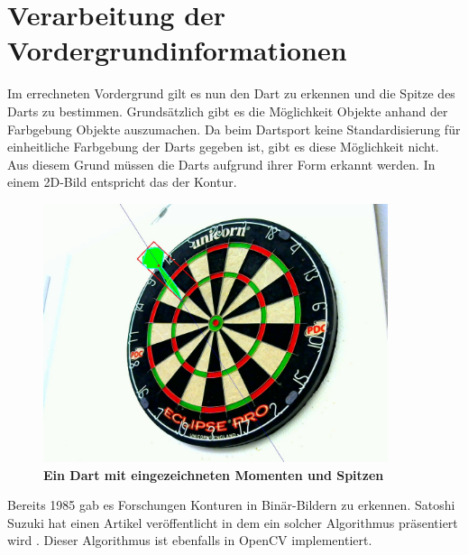 \section{Verarbeitung der Vordergrundinformationen}
\label{sec:foreground}
Im errechneten Vordergrund gilt es nun den Dart zu erkennen und die Spitze des Darts zu bestimmen. Grundsätzlich gibt es die Möglichkeit Objekte anhand der Farbgebung Objekte auszumachen. Da beim Dartsport keine Standardisierung für einheitliche Farbgebung der Darts gegeben ist, gibt es diese Möglichkeit nicht. Aus diesem Grund müssen die Darts aufgrund ihrer Form erkannt werden. In einem 2D-Bild entspricht das der Kontur.
\begin{figure}[ht]
\centering
\includegraphics[width=0.9\textwidth]{media/backgroundfeature}
\caption{\textbf{Ein Dart mit eingezeichneten Momenten und Spitzen}}
\label{Fig:detecteddart}
\end{figure}
Bereits 1985 gab es Forschungen Konturen in Binär-Bildern zu erkennen. Satoshi Suzuki hat einen Artikel veröffentlicht in dem ein solcher Algorithmus präsentiert wird \autocite{contour1985}. Dieser Algorithmus ist ebenfalls in OpenCV implementiert. 


